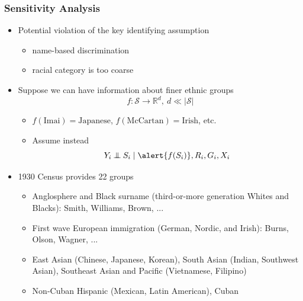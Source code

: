 \documentclass{beamer}
\newcommand{\indep}{\mathbin{\perp\!\!\!\!\!\:\perp}}
\newcommand{\R}{\ensuremath{\mathbb{R}}}
\newcommand{\cS}{\mathcal{S}}
\begin{document}
\begin{frame}

  \frametitle{Sensitivity Analysis}

  \begin{itemize}
  \item Potential violation of the key identifying assumption
    \begin{itemize}
    \item name-based discrimination
    \item racial category is too coarse
    \end{itemize}

  \item Suppose we can have information about finer ethnic groups
    $$f:\cS\to\R^d,\  d\ll|\cS|$$
    \begin{itemize}
    \item $f(\text{Imai}) = \text{Japanese}$,  $f(\text{McCartan}) =
      \text{Irish}$, etc.
    \item Assume instead
      $$Y_i\indep S_i\mid \alert{f(S_i)},R_i,G_i,X_i$$
    \end{itemize}

  \item 1930 Census provides 22 groups
    \begin{itemize}
    \item Anglosphere and Black surname (third-or-more generation
      Whites and Blacks): Smith, Williams, Brown,
      ...
    \item First wave European immigration (German, Nordic, and Irish): Burns, Olson, Wagner, ...
    \item East Asian (Chinese, Japanese, Korean), South Asian
      (Indian, Southwest Asian),
      Southeast Asian and Pacific (Vietnamese, Filipino)
    \item Non-Cuban Hispanic (Mexican, Latin American), Cuban 
    \end{itemize}
 \end{itemize}


\end{frame}
\end{document}
